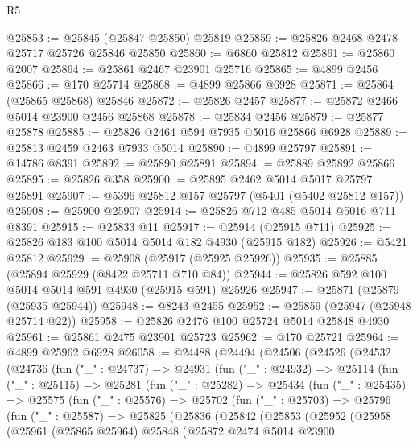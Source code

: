 \begin{lexlean}{R5}
\begin{coremodule}
@25853 := @25845 (@25847 @25850) @25819
@25859 := @25826 @2468 @2478 @25717 @25726 @25846 @25850
@25860 := @6860 @25812
@25861 := @25860 @2007
@25864 := @25861 @2467 @23901 @25716
@25865 := @4899 @2456
@25866 := @170 @25714
@25868 := @4899 @25866 @6928
@25871 := @25864 (@25865 @25868) @25846
@25872 := @25826 @2457
@25877 := @25872 @2466 @5014 @23900 @2456 @25868
@25878 := @25834 @2456
@25879 := @25877 @25878
@25885 := @25826 @2464 @594 @7935 @5016 @25866 @6928
@25889 := @25813 @2459 @2463 @7933 @5014
@25890 := @4899 @25797
@25891 := @14786 @8391
@25892 := @25890 @25891
@25894 := @25889 @25892 @25866
@25895 := @25826 @358
@25900 := @25895 @2462 @5014 @5017 @25797 @25891
@25907 := @5396 @25812 @157 @25797 (@5401 (@5402 @25812 @157))
@25908 := @25900 @25907
@25914 := @25826 @712 @485 @5014 @5016 @711 @8391
@25915 := @25833 @11
@25917 := @25914 (@25915 @711)
@25925 := @25826 @183 @100 @5014 @5014 @182 @4930 (@25915 @182)
@25926 := @5421 @25812
@25929 := @25908 (@25917 (@25925 @25926))
@25935 := @25885 (@25894 @25929 (@8422 @25711 @710 @84))
@25944 := @25826 @592 @100 @5014 @5014 @591 @4930 (@25915 @591) @25926
@25947 := @25871 (@25879 (@25935 @25944))
@25948 := @8243 @2455
@25952 := @25859 (@25947 (@25948 @25714 @22))
@25958 := @25826 @2476 @100 @25724 @5014 @25848 @4930
@25961 := @25861 @2475 @23901 @25723
@25962 := @170 @25721
@25964 := @4899 @25962 @6928
@26058 := @24488
    (@24494
      (@24506
        (@24526
          (@24532
            (@24736
              (fun ("_" : @24737) =>
              @24931
                (fun ("_" : @24932) =>
                @25114
                  (fun ("_" : @25115) =>
                  @25281
                    (fun ("_" : @25282) =>
                    @25434
                      (fun ("_" : @25435) =>
                      @25575
                        (fun ("_" : @25576) =>
                        @25702
                          (fun ("_" : @25703) =>
                          @25796
                            (fun ("_" : @25587) =>
                            @25825
                              (@25836
                                (@25842
                                  (@25853
                                    (@25952
                                      (@25958
                                        (@25961
                                          (@25865 @25964)
                                          @25848
                                          (@25872
                                            @2474
                                            @5014
                                            @23900

\end{coremodule}
\end{lexlean}
